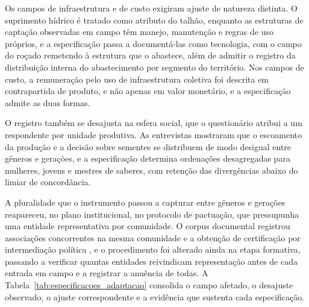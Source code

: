 \documentclass[preprint,authoryear,12pt]{elsarticle}
\begin{document}
Os campos de infraestrutura e de custo exigiram ajuste de natureza distinta. O suprimento hídrico é tratado como atributo do talhão, enquanto as estruturas de captação observadas em campo têm manejo, manutenção e regras de uso próprios, e a especificação passa a documentá-las como tecnologia, com o campo do roçado remetendo à estrutura que o abastece, além de admitir o registro da distribuição interna do abastecimento por segmento do território. Nos campos de custo, a remuneração pelo uso de infraestrutura coletiva foi descrita em contrapartida de produto, e não apenas em valor monetário, e a especificação admite as duas formas.

O registro também se desajusta na esfera social, que o questionário atribui a um respondente por unidade produtiva. As entrevistas mostraram que o escoamento da produção e a decisão sobre sementes se distribuem de modo desigual entre gêneros e gerações, e a especificação determina ordenações desagregadas para mulheres, jovens e mestres de saberes, com retenção das divergências abaixo do limiar de concordância.

A pluralidade que o instrumento passou a capturar entre gêneros e gerações reapareceu, no plano institucional, no protocolo de pactuação, que pressupunha uma entidade representativa por comunidade. O corpus documental registrou associações concorrentes na mesma comunidade e a obtenção de certificação por intermediação política \citep{Fernandes2013}, e o procedimento foi alterado ainda na etapa formativa, passando a verificar quantas entidades reivindicam representação antes de cada entrada em campo e a registrar a anuência de todas. A Tabela~\ref{tab:especificacoes_adaptacao} consolida o campo afetado, o desajuste observado, o ajuste correspondente e a evidência que sustenta cada especificação.
\end{document}
